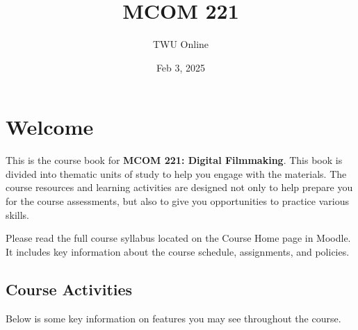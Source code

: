 \documentclass[
  letterpaper,
  DIV=11,
  numbers=noendperiod]{scrreprt}
\title{MCOM 221}
\author{TWU Online}
\date{Feb 3, 2025}
\renewcommand*\contentsname{Table of contents}
\newcommand\contentsname{Table of contents}
\begin{document}
\maketitle

\renewcommand*\contentsname{Table of contents}
{
\hypersetup{linkcolor=}
\setcounter{tocdepth}{2}
\tableofcontents
}


\chapter*{Welcome}\label{welcome}


This is the course book for \textbf{MCOM 221: Digital Filmmaking}. This
book is divided into thematic units of study to help you engage with the
materials. The course resources and learning activities are designed not
only to help prepare you for the course assessments, but also to give
you opportunities to practice various skills.

\begin{tcolorbox}[enhanced jigsaw, leftrule=.75mm, bottomrule=.15mm, colback=white, colframe=quarto-callout-note-color-frame, left=2mm, opacityback=0, rightrule=.15mm, breakable, arc=.35mm, toprule=.15mm]
\begin{minipage}[t]{5.5mm}
\textcolor{quarto-callout-note-color}{\faInfo}
\end{minipage}%
\begin{minipage}[t]{\textwidth - 5.5mm}

Please read the full course syllabus located on the Course Home page in
Moodle. It includes key information about the course schedule,
assignments, and policies.

\end{minipage}%
\end{tcolorbox}

\section*{Course Activities}\label{course-activities}


Below is some key information on features you may see throughout the
course.
\end{document}
